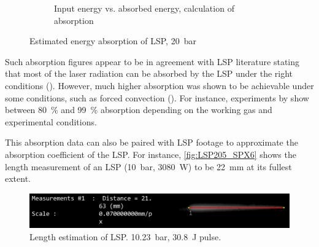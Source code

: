 \begin{figure}[h]
\begin{subfigure}[t]{0.47\textwidth}
                    \caption{Input energy vs. absorbed energy, calculation of absorption}
                    \label{fig:absorption_20bar}
                \end{subfigure}
                \caption{Estimated energy absorption of LSP, \qty{20}{bar}}
                \label{fig:LSP_absorption_data}
            \end{figure}

            Such absorption figures appear to be in agreement with LSP literature stating that most of the laser radiation can be absorbed by the LSP under the right conditions (\textcite{keeferLaserSustainedPlasmas1989}). However, much higher absorption was shown to be achievable under some conditions, such as forced convection (\textcite{fowlerIgnitionMaintenanceSubsonic1975}). For instance, experiments by \textcite{toyodaThrustPerformanceCW2002} show between 80~\% and 99~\% absorption depending on the working gas and experimental conditions.

            This absorption data can also be paired with LSP footage to approximate the absorption coefficient of the LSP. For instance, \autoref{fig:LSP205_SPX6} shows the length measurement of an LSP (\qty{10}{bar}, \qty{3080}{W}) to be \qty{22}{mm} at its fullest extent.

            \begin{figure}[h]
                \centering
                \includegraphics[width=\textwidth]{assets/5 results/LSP6_10.23_length.png}
                \caption[Length estimation of LSP]{Length estimation of LSP. \qty{10.23}{bar}, \qty{30.8}{J} pulse. }
                \label{fig:LSP205_SPX6}
            \end{figure}

